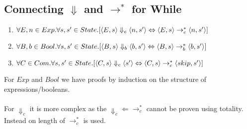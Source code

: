 \documentclass{report}
\begin{document}
\subsection*{Connecting $\Downarrow$ and $\to^*$ for While}

\begin{enumerate}
	\item $\forall E, n \in Exp. \forall s, s' \in State . [\langle E, s \rangle \Downarrow_e \langle n, s' \rangle \Leftrightarrow \langle E, s \rangle \to_e^* \langle n, s' \rangle]$
	\item $\forall B, b \in Bool. \forall s, s' \in State . [\langle B, s \rangle \Downarrow_b \langle b, s' \rangle \Leftrightarrow \langle B, s \rangle \to_b^* \langle b, s' \rangle]$
	\item $\forall C \in Com. \forall s, s' \in State . [\langle C, s \rangle \Downarrow_c \langle s' \rangle \Leftrightarrow \langle C, s \rangle \to_c^* \langle skip, s' \rangle]$
\end{enumerate}
For $Exp$ and $Bool$ we have proofs by induction on the structure of expressions/booleans.
\\
\\ For $\Downarrow_c$ it is more complex as the $\Downarrow_c \Leftarrow \to_c^*$ cannot be proven using totality. Instead  on length of $\to_c^*$ is used.
\end{document}
